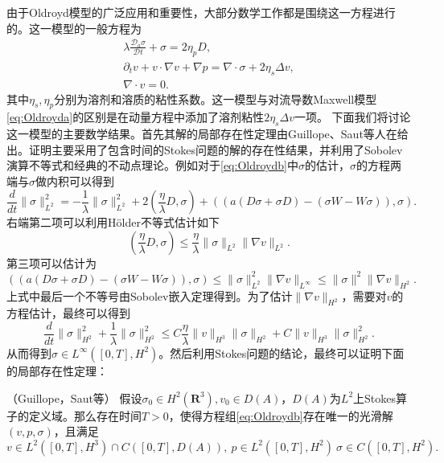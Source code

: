 由于Oldroyd模型的广泛应用和重要性，大部分数学工作都是围绕这一方程进行的。这一模型的一般方程为
\begin{subequations}\label{eq:Oldroydb}
\begin{align}
	\lambda \frac{\mathcal{D}_a \sigma}{\mathcal{D} t} + \sigma = 2 \eta_p D, \\
	\partial_t v + v \cdot \nabla v  + \nabla p = \nabla \cdot \sigma + 2 \eta_s \Delta v, \\
	\nabla \cdot v = 0.
\end{align}
\end{subequations}
其中$\eta_s,\eta_p$分别为溶剂和溶质的粘性系数。这一模型与对流导数Maxwell模型\eqref{eq:Oldroyda}的区别是在动量方程中添加了溶剂粘性$2\eta_s \Delta v$一项。
下面我们将讨论这一模型的主要数学结果。首先其解的局部存在性定理由Guillope、Saut等人在\cite{guillope1990existence}给出。证明主要采用了包含时间的Stokes问题的解的存在性结果\cite{temam1995navier}，并利用了Sobolev演算不等式\cite{majda2012compressible}和经典的不动点理论。例如对于\eqref{eq:Oldroydb}中$\sigma$的估计，$\sigma$的方程两端与$\sigma$做内积可以得到
\begin{equation*}
	\frac{d}{dt} \|\sigma\|_{L^2}^2  =  -\frac{1}{\lambda} \|\sigma\|_{L^2}^2 + 2 (\frac{\eta}{\lambda} D, \sigma) + \left( (a(D \sigma + \sigma D) - (\sigma W -W \sigma)),\sigma \right).
\end{equation*}
右端第二项可以利用H\"older不等式估计如下
\begin{equation*}
	(\frac{\eta}{\lambda} D, \sigma) \le \frac{\eta}{\lambda} \|\sigma\|_{L^2} \|\nabla v\|_{L^2}.
\end{equation*}
第三项可以估计为
\begin{equation*}
	 \left( (a(D \sigma + \sigma D) - (\sigma W -W \sigma)),\sigma \right) \le \|\sigma\|_{L^2}^2 \|\nabla v\|_{L^\infty} \le \|\sigma\|^2 \|\nabla v\|_{H^2}
.
\end{equation*}
上式中最后一个不等号由Sobolev嵌入定理得到。为了估计$\|\nabla v\|_{H^2}$，需要对$v$的方程估计，最终可以得到\cite{guillope1990existence}
\begin{equation*}
		\frac{d}{dt} \|\sigma\|_{H^2}^2 + \frac{1}{\lambda} \|\sigma\|_{H^2}^2 \le C \frac{\eta}{\lambda} \|v\|_{H^3} \|\sigma\|_{H^2} + C \|v\|_{H^3} \|\sigma\|_{H^2}^2.
\end{equation*}
从而得到$\sigma \in L^\infty([0,T],H^2)$。然后利用Stokes问题的结论，最终可以证明下面的局部存在性定理：
\begin{theorem}（Guillope，Saut等\cite{guillope1990existence,saut2012lectures}）
	假设$\sigma_0 \in H^2(\mathbf{R}^3),v_0 \in D(A)$，$D(A)$为$L^2$上Stokes算子的定义域。那么存在时间$T>0$，使得方程组\eqref{eq:Oldroydb}存在唯一的光滑解$(v,p,\sigma)$，且满足
	\begin{equation*}
		v \in L^2([0,T],H^3) \cap C([0,T],D(A)), \ p \in L^2([0,T],H^2) \ \sigma \in C([0,T],H^2).
	\end{equation*}
\end{theorem}
